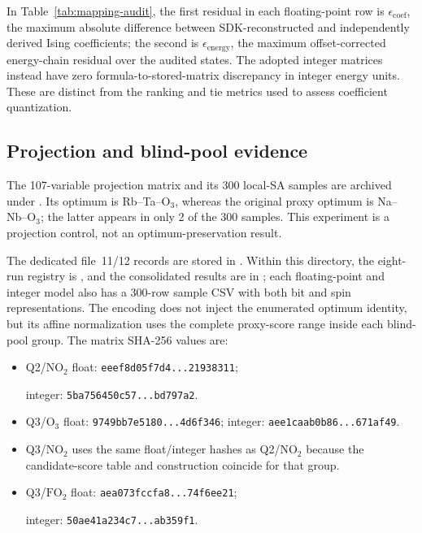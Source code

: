 In Table~\ref{tab:mapping-audit}, the first residual in each floating-point
row is $\epsilon_{\mathrm{coef}}$, the maximum absolute difference between
SDK-reconstructed and independently derived Ising coefficients; the second
is $\epsilon_{\mathrm{energy}}$, the maximum offset-corrected energy-chain
residual over the audited states.  The adopted integer matrices instead
have zero formula-to-stored-matrix discrepancy in integer energy units.
These are distinct from the ranking and tie metrics used to assess
coefficient quantization.

\subsection{Projection and blind-pool evidence}

The 107-variable projection matrix and its 300 local-SA samples are
archived under .  Its optimum is
Rb--Ta--$\mathrm{O}_3$, whereas the original proxy optimum is Na--Nb--$\mathrm{O}_3$; the latter
appears in only 2 of the 300 samples.  This experiment is a projection
control, not an optimum-preservation result.

The dedicated file~11/12 records are stored in
.  Within this directory, the
eight-run registry is , and the consolidated results are
in ; each floating-point and integer model
also has a 300-row sample CSV with both bit and spin representations.  The
encoding does not inject the enumerated optimum identity, but its affine
normalization uses the complete proxy-score range inside each blind-pool
group.  The matrix SHA-256 values are:

\begin{itemize}[leftmargin=2em]
 \item Q2/$\mathrm{NO}_2$ float: \texttt{eeef8d05f7d4...21938311};\par
       integer: \texttt{5ba756450c57...bd797a2}.
 \item Q3/$\mathrm{O}_3$ float: \texttt{9749bb7e5180...4d6f346};
       integer: \texttt{aee1caab0b86...671af49}.
 \item Q3/$\mathrm{NO}_2$ uses the same float/integer hashes as Q2/$\mathrm{NO}_2$ because the
       candidate-score table and construction coincide for that group.
 \item Q3/$\mathrm{FO}_2$ float: \texttt{aea073fccfa8...74f6ee21};\par
       integer: \texttt{50ae41a234c7...ab359f1}.
\end{itemize}


